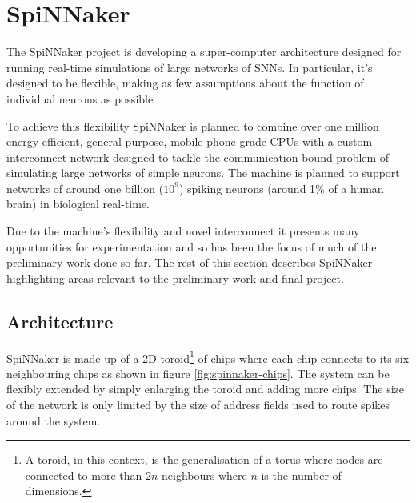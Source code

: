 	\section{SpiNNaker}
		
		\label{sec:spinnaker}
		
		
		The SpiNNaker project is developing a super-computer architecture designed
		for running real-time simulations of large networks of SNNs. In particular,
		it's designed to be flexible, making as few assumptions about the
		function of individual neurons as possible \cite{furber06}.
		
		To achieve this flexibility SpiNNaker is planned to combine over one million
		energy-efficient, general purpose, mobile phone grade CPUs with a custom
		interconnect network designed to tackle the communication bound problem of
		simulating large networks of simple neurons. The machine is planned to
		support networks of around one billion ($10^9$) spiking neurons (around 1\%
		of a human brain) in biological real-time.
		
		Due to the machine's flexibility and novel interconnect it presents many
		opportunities for experimentation and so has been the focus of much of the
		preliminary work done so far. The rest of this section describes SpiNNaker
		highlighting areas relevant to the preliminary work and final project.
		
		\subsection{Architecture}
			
			
			SpiNNaker is made up of a 2D toroid\footnote{A toroid, in this context, is
			the generalisation of a torus where nodes are connected to more than $2n$
			neighbours where $n$ is the number of dimensions.} of chips where each
			chip connects to its six neighbouring chips as shown in figure
			\ref{fig:spinnaker-chips}. The system can be flexibly extended by simply
			enlarging the toroid and adding more chips. The size of the network is
			only limited by the size of address fields used to route spikes around the
			system.
			
